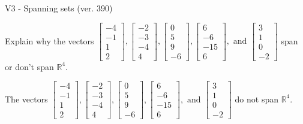\begin{exercise}
  \begin{exerciseTitle}V3 - Spanning sets (ver. 390)\end{exerciseTitle}
  \begin{exerciseStatement}
    Explain why the vectors \(\left[\begin{array}{r}
-4 \\
-1 \\
1 \\
2
\end{array}\right] , \left[\begin{array}{r}
-2 \\
-3 \\
-4 \\
4
\end{array}\right] , \left[\begin{array}{r}
0 \\
5 \\
9 \\
-6
\end{array}\right] , \left[\begin{array}{r}
6 \\
-6 \\
-15 \\
6
\end{array}\right] , \text{ and } \left[\begin{array}{r}
3 \\
1 \\
0 \\
-2
\end{array}\right]\) span or don't span \(\mathbb{R}^4\). 
	


  \end{exerciseStatement}
  \begin{exerciseAnswer}
   The vectors \(\left[\begin{array}{r}
-4 \\
-1 \\
1 \\
2
\end{array}\right] , \left[\begin{array}{r}
-2 \\
-3 \\
-4 \\
4
\end{array}\right] , \left[\begin{array}{r}
0 \\
5 \\
9 \\
-6
\end{array}\right] , \left[\begin{array}{r}
6 \\
-6 \\
-15 \\
6
\end{array}\right] , \text{ and } \left[\begin{array}{r}
3 \\
1 \\
0 \\
-2
\end{array}\right]\) 
  	 do not  
	span \(\mathbb{R}^4\).
  



\end{exerciseAnswer}
\end{exercise}
